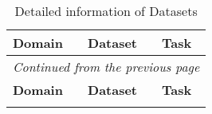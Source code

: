 \onecolumn
\begin{longtable}{p{2cm}p{6cm}p{6cm}}   %
\caption{Detailed information of Datasets}  %
\label{tab:dataset2task}  %
\\  %
\hline
\textbf{Domain} &  \textbf{Dataset} &   \textbf{Task} \\
\hline
\endfirsthead  %
\multicolumn{3}{|c|}{\textit{Continued from the previous page}} \\  %
\hline
\textbf{Domain} &  \textbf{Dataset}  &  \textbf{Task} \\
\hline
\endhead  %
\hline
\endfoot  %
\hline
\endlastfoot  %


\end{longtable}
